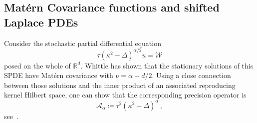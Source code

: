 \documentclass[
fontsize=11pt,
paper=a4,
numbers=noenddot
]{scrartcl}
\begin{document}
\subsection*{Mat\'ern Covariance functions and shifted Laplace PDEs}
Consider the stochastic partial differential equation
\begin{equation*}
    \tau {(\kappa^2 - \Delta)}^{\alpha / 2} u = \mathcal{W}
\end{equation*}
posed on the whole of $\mathbb{R}^d$. Whittle has shown that the stationary solutions of this SPDE have Mat\'ern covariance with $\nu = \alpha - d/2$. Using a close connection between those solutions and the inner product of an associated reproducing kernel Hilbert space, one can show that the corresponding precision operator is
\begin{equation*}
    \mathcal{A}_\alpha \coloneqq \tau^2 {(\kappa^2 - \Delta)}^\alpha\,,
\end{equation*}
see~\cite[Sec.\ 2.2]{lindgrenSPDEApproachGaussian2022}.


\printbibliography
\end{document}
